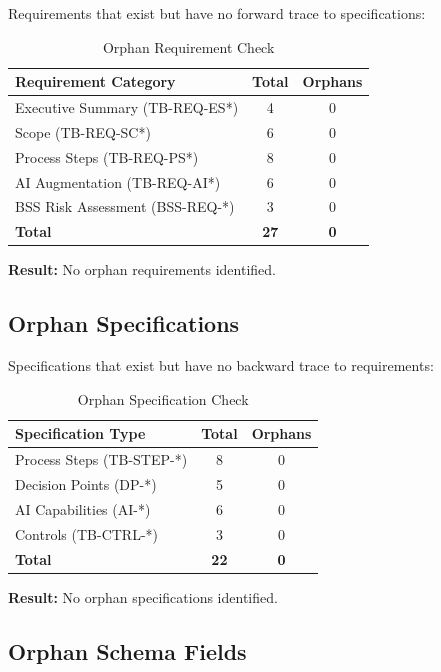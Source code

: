 \documentclass[11pt,a4paper,twoside]{report}
\begin{document}
Requirements that exist but have no forward trace to specifications:

\begin{table}[h]
\centering
\caption{Orphan Requirement Check}
\label{tab:orphan-requirements}
\begin{tabular}{@{}lcc@{}}
\toprule
\textbf{Requirement Category} & \textbf{Total} & \textbf{Orphans} \\
\midrule
Executive Summary (TB-REQ-ES*) & 4 & 0 \\
Scope (TB-REQ-SC*) & 6 & 0 \\
Process Steps (TB-REQ-PS*) & 8 & 0 \\
AI Augmentation (TB-REQ-AI*) & 6 & 0 \\
BSS Risk Assessment (BSS-REQ-*) & 3 & 0 \\
\midrule
\textbf{Total} & \textbf{27} & \textbf{0} \\
\bottomrule
\end{tabular}
\end{table}

\textcolor{sourcegreen}{\textbf{Result:}} No orphan requirements identified.

\subsection{Orphan Specifications}

Specifications that exist but have no backward trace to requirements:

\begin{table}[h]
\centering
\caption{Orphan Specification Check}
\label{tab:orphan-specifications}
\begin{tabular}{@{}lcc@{}}
\toprule
\textbf{Specification Type} & \textbf{Total} & \textbf{Orphans} \\
\midrule
Process Steps (TB-STEP-*) & 8 & 0 \\
Decision Points (DP-*) & 5 & 0 \\
AI Capabilities (AI-*) & 6 & 0 \\
Controls (TB-CTRL-*) & 3 & 0 \\
\midrule
\textbf{Total} & \textbf{22} & \textbf{0} \\
\bottomrule
\end{tabular}
\end{table}

\textcolor{sourcegreen}{\textbf{Result:}} No orphan specifications identified.

\subsection{Orphan Schema Fields}
\end{document}
